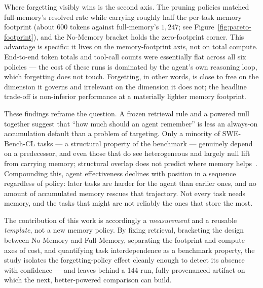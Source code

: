 Where forgetting visibly wins is the second axis. The pruning policies matched
full-memory's resolved rate while carrying roughly half the per-task memory footprint
(about $600$ tokens against full-memory's $1{,}247$; see
Figure~\ref{fig:pareto-footprint}), and the No-Memory bracket holds the zero-footprint
corner. This advantage is specific: it lives on the memory-footprint axis, not on total
compute. End-to-end token totals and tool-call counts were essentially flat across all six
policies --- the cost of these runs is dominated by the agent's own reasoning loop, which
forgetting does not touch. Forgetting, in other words, is close to free on the dimension it
governs and irrelevant on the dimension it does not; the headline trade-off is non-inferior
performance at a materially lighter memory footprint.

These findings reframe the question. A frozen retrieval rule and a powered null together
suggest that ``how much should an agent remember'' is less an always-on accumulation
default than a problem of targeting. Only a minority of SWE-Bench-CL tasks --- a structural
property of the benchmark --- genuinely depend on a predecessor, and even those that do see
heterogeneous and largely null lift from carrying memory; structural overlap does not
predict where memory helps~\cite{xiong2025}. Compounding this, agent effectiveness declines
with position in a sequence regardless of policy: later tasks are harder for the agent than
earlier ones, and no amount of accumulated memory rescues that trajectory. Not every task
needs memory, and the tasks that might are not reliably the ones that store the most.

The contribution of this work is accordingly a \emph{measurement} and a reusable
\emph{template}, not a new memory policy. By fixing retrieval, bracketing the design
between No-Memory and Full-Memory, separating the footprint and compute axes of cost, and
quantifying task interdependence as a benchmark property, the study isolates the
forgetting-policy effect cleanly enough to detect its absence with confidence --- and
leaves behind a 144-run, fully provenanced artifact on which the next, better-powered
comparison can build.
